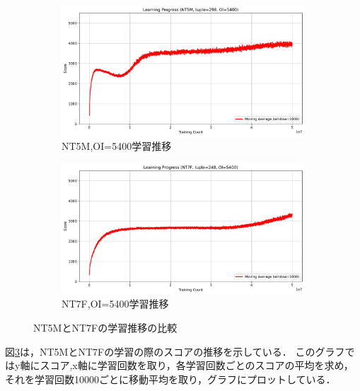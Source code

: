 \begin{figure}[t]
    \vspace{1em}
    \begin{subfigure}[b]{0.49\linewidth}
        \includegraphics[width=\linewidth]{pdf/learning_progress_plots/learning_progress_NT5_tuple298_OI5400.pdf}
        \caption{NT5M,OI=5400学習推移}
        \label{fig:NT5M_OI5400_learning_progress}
    \end{subfigure}
    \begin{subfigure}[b]{0.49\linewidth}
        \includegraphics[width=\linewidth]{pdf/learning_progress_plots/learning_progress_NT7_tuple248_OI5400.pdf}
        \caption{NT7F,OI=5400学習推移}
        \label{fig:NT7F_OI5400_learning_progress}
    \end{subfigure}

    \caption{NT5MとNT7Fの学習推移の比較}
    \label{fig:learning_progress_comparison}
\end{figure}

図\ref{fig:learning_progress_comparison}は，NT5MとNT7Fの学習の際のスコアの推移を示している．
このグラフではy軸にスコア,x軸に学習回数を取り，各学習回数ごとのスコアの平均を求め，
それを学習回数10000ごとに移動平均を取り，グラフにプロットしている．

